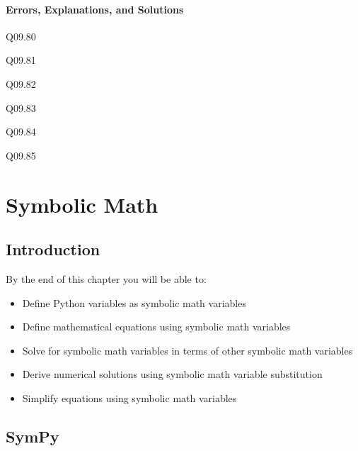 \documentclass{book}
\begin{document}
    




    
        \subsubsection{Errors, Explanations, and
Solutions}\label{errors-explanations-and-solutions}

Q09.80

Q09.81

Q09.82

Q09.83

Q09.84

Q09.85
    




    
        \chapter{Symbolic Math}\label{symbolic-math}
    




    
        \section{Introduction}\label{introduction}
    




    
        By the end of this chapter you will be able to:

\begin{itemize}
\item
  Define Python variables as symbolic math variables
\item
  Define mathematical equations using symbolic math variables
\item
  Solve for symbolic math variables in terms of other symbolic math
  variables
\item
  Derive numerical solutions using symbolic math variable substitution
\item
  Simplify equations using symbolic math variables
\end{itemize}
        \newpage



    




    
        \section{SymPy}\label{sympy}
    
\end{document}
